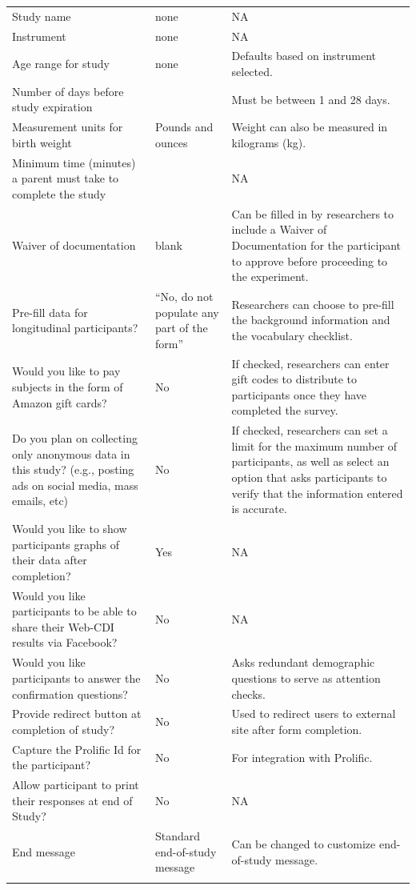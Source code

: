 \documentclass[
  english,
  ,man,floatsintext]{apa6}
\begin{document}
\begin{longtable}[t]{>{\raggedright\arraybackslash}p{2.2in}>{\raggedright\arraybackslash}p{1.2in}>{\raggedright\arraybackslash}p{2.2in}}
\endfoot
\bottomrule
\endlastfoot
Study name & none & NA\\
Instrument & none & NA\\
Age range for study & none & Defaults based on instrument selected.\\
Number of days before study expiration & 14 & Must be between 1 and 28 days.\\
Measurement units for birth weight & Pounds and ounces & Weight can also be measured in kilograms (kg).\\
Minimum time (minutes) a parent must take to complete the study & 6 & NA\\
Waiver of documentation & blank & Can be filled in by researchers to include a Waiver of Documentation for the participant to approve before proceeding to the experiment.\\
Pre-fill data for longitudinal participants? & “No, do not populate any part of the form” & Researchers can choose to pre-fill the background information and the vocabulary checklist.\\
Would you like to pay subjects in the form of Amazon gift cards? & No & If checked, researchers can enter gift codes to distribute to participants once they have completed the survey.\\
Do you plan on collecting only anonymous data in this study? (e.g., posting ads on social media, mass emails, etc) & No & If checked, researchers can set a limit for the maximum number of participants, as well as select an option that asks participants to verify that the information entered is accurate.\\
Would you like to show participants graphs of their data after completion? & Yes & NA\\
Would you like participants to be able to share their Web-CDI results via Facebook? & No & NA\\
Would you like participants to answer the confirmation questions? & No & Asks redundant demographic questions to serve as attention checks.\\
Provide redirect button at completion of study? & No & Used to redirect users to external site after form completion.\\
Capture the Prolific Id for the participant? & No & For integration with Prolific.\\
Allow participant to print their responses at end of Study? & No & NA\\
End message & Standard end-of-study message & Can be changed to customize end-of-study message.\\*
\end{longtable}
\end{document}
